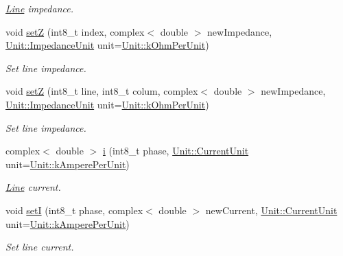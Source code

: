 \begin{DoxyCompactItemize}
\begin{DoxyCompactList}\small\item\em \hyperlink{class_line}{Line} impedance. \end{DoxyCompactList}\item 
void \hyperlink{group___models_ga2b8fe47ae4ae2d4422d9431e17b4927d}{set\+Z} (int8\+\_\+t index, complex$<$ double $>$ new\+Impedance, \hyperlink{class_unit_a3747e779c805df24a71961290be3fbdf}{Unit\+::\+Impedance\+Unit} unit=\hyperlink{class_unit_a3747e779c805df24a71961290be3fbdfa9327dc8628a47375d70037499f9d0910}{Unit\+::k\+Ohm\+Per\+Unit})
\begin{DoxyCompactList}\small\item\em Set line impedance. \end{DoxyCompactList}\item 
void \hyperlink{group___models_ga0c6767e389e4ee26932b6f22ca8f89f5}{set\+Z} (int8\+\_\+t line, int8\+\_\+t colum, complex$<$ double $>$ new\+Impedance, \hyperlink{class_unit_a3747e779c805df24a71961290be3fbdf}{Unit\+::\+Impedance\+Unit} unit=\hyperlink{class_unit_a3747e779c805df24a71961290be3fbdfa9327dc8628a47375d70037499f9d0910}{Unit\+::k\+Ohm\+Per\+Unit})
\begin{DoxyCompactList}\small\item\em Set line impedance. \end{DoxyCompactList}\item 
complex$<$ double $>$ \hyperlink{group___models_ga2ad899adaa4f2e25b38c58e076db94ea}{i} (int8\+\_\+t phase, \hyperlink{class_unit_a0794cf6c9682f48296dd4a5315389787}{Unit\+::\+Current\+Unit} unit=\hyperlink{class_unit_a0794cf6c9682f48296dd4a5315389787aeed3b50e464d581cb630181a3b6a0709}{Unit\+::k\+Ampere\+Per\+Unit})
\begin{DoxyCompactList}\small\item\em \hyperlink{class_line}{Line} current. \end{DoxyCompactList}\item 
void \hyperlink{group___models_gab01ecad45ee9d81a33b9f5806533066c}{set\+I} (int8\+\_\+t phase, complex$<$ double $>$ new\+Current, \hyperlink{class_unit_a0794cf6c9682f48296dd4a5315389787}{Unit\+::\+Current\+Unit} unit=\hyperlink{class_unit_a0794cf6c9682f48296dd4a5315389787aeed3b50e464d581cb630181a3b6a0709}{Unit\+::k\+Ampere\+Per\+Unit})
\begin{DoxyCompactList}\small\item\em Set line current. \end{DoxyCompactList}\item 

\end{DoxyCompactItemize}

